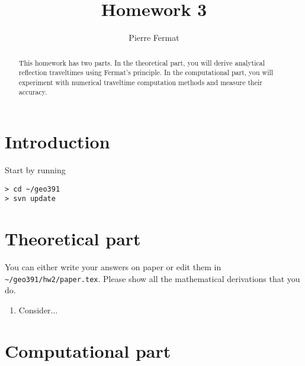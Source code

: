 \author{Pierre Fermat}
\title{Homework 3}

\begin{abstract}
This homework has two parts. In the theoretical part, you will derive
analytical reflection traveltimes using Fermat's principle. In the
computational part, you will experiment with numerical traveltime
computation methods and measure their accuracy.
\end{abstract}

\section{Introduction}

Start by running
\begin{verbatim}
> cd ~/geo391
> svn update
\end{verbatim}

\section{Theoretical part}

You can either write your answers on paper or edit them in
\verb#~/geo391/hw2/paper.tex#. Please show all the mathematical derivations that
you do.

\begin{enumerate}
\item Consider...
\end{enumerate}

\section{Computational part}


